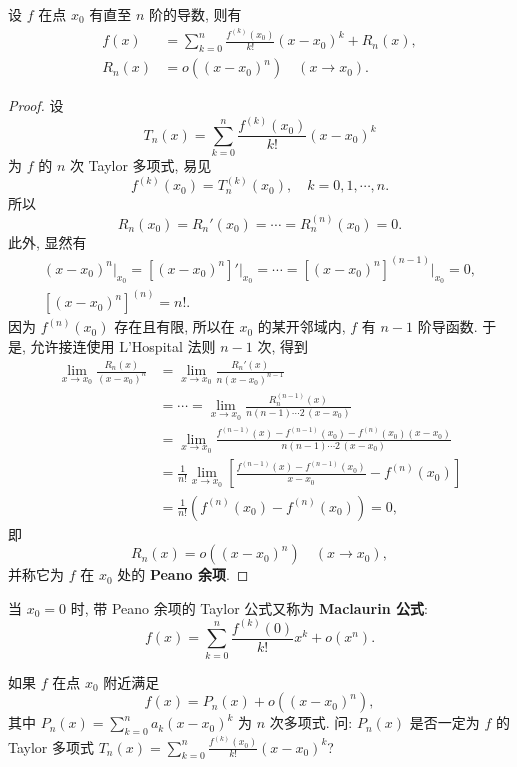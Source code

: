 \begin{theorem}\label{thm:4.1.2}
设 $f$ 在点 $x_{0}$ 有直至 $n$ 阶的导数, 则有
\begin{align*}
f(x)&=\sum_{k=0}^{n}\frac{f^{(k)}(x_{0})}{k!}(x-x_{0})^{k}+R_{n}(x),\\
R_{n}(x)&=o((x-x_{0})^{n})\quad (x\to x_{0}).
\end{align*}
\end{theorem}

\begin{proof}
设
\[
T_{n}(x)=\sum_{k=0}^{n}\frac{f^{(k)}(x_{0})}{k!}(x-x_{0})^{k}
\]
为 $f$ 的 $n$ 次 Taylor 多项式, 易见
\[
f^{(k)}(x_{0})=T_{n}^{(k)}(x_{0}),\quad k=0,1,\cdots,n.
\]
所以
\[
R_{n}(x_{0})=R_{n}'(x_{0})=\cdots=R_{n}^{(n)}(x_{0})=0.
\]
此外, 显然有
\begin{gather*}
(x-x_{0})^{n}\big|_{x_{0}}=\left[(x-x_{0})^{n}\right]'\big|_{x_{0}}=\cdots=\left[(x-x_{0})^{n}\right]^{(n-1)}\big|_{x_{0}}=0,\\
\left[(x-x_{0})^{n}\right]^{(n)}=n!.
\end{gather*}
因为 $f^{(n)}(x_{0})$ 存在且有限, 所以在 $x_{0}$ 的某开邻域内, $f$ 有 $n-1$ 阶导函数. 于是, 允许接连使用 L'Hospital 法则 $n-1$ 次, 得到
\begin{align*}
\lim_{x\to x_{0}}\frac{R_{n}(x)}{(x-x_{0})^{n}}&=\lim_{x\to x_{0}}\frac{R_{n}'(x)}{n(x-x_{0})^{n-1}}\\
&=\cdots=\lim_{x\to x_{0}}\frac{R_{n}^{(n-1)}(x)}{n(n-1)\cdots 2\,(x-x_{0})}\\
&=\lim_{x\to x_{0}}\frac{f^{(n-1)}(x)-f^{(n-1)}(x_{0})-f^{(n)}(x_{0})(x-x_{0})}{n(n-1)\cdots 2\,(x-x_{0})}\\
&=\frac{1}{n!}\lim_{x\to x_{0}}\left[\frac{f^{(n-1)}(x)-f^{(n-1)}(x_{0})}{x-x_{0}}-f^{(n)}(x_{0})\right]\\
&=\frac{1}{n!}(f^{(n)}(x_{0})-f^{(n)}(x_{0}))=0,
\end{align*}
即
\[
R_{n}(x)=o((x-x_{0})^{n})\quad (x\to x_{0}),
\]
并称它为 $f$ 在 $x_{0}$ 处的 \textbf{Peano 余项}.
\end{proof}

当 $x_{0}=0$ 时, 带 Peano 余项的 Taylor 公式又称为 \textbf{Maclaurin 公式}:
\[
f(x)=\sum_{k=0}^{n}\frac{f^{(k)}(0)}{k!}x^{k}+o(x^{n}).
\]

\begin{example}\label{ex:4.1.1}
如果 $f$ 在点 $x_{0}$ 附近满足
\[
f(x)=P_{n}(x)+o((x-x_{0})^{n}),
\]
其中 $P_{n}(x)=\sum\limits_{k=0}^{n}a_{k}(x-x_{0})^{k}$ 为 $n$ 次多项式. 问: $P_{n}(x)$ 是否一定为 $f$ 的 Taylor 多项式 $T_{n}(x)=\sum\limits_{k=0}^{n}\frac{f^{(k)}(x_{0})}{k!}(x-x_{0})^{k}$?
\end{example}

